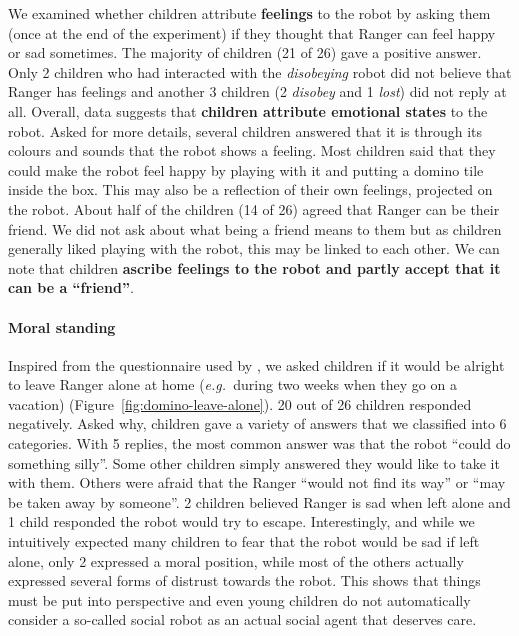 \documentclass{sig-alternate}
\newcommand{\eg}{{\textit{e.g.~}}}
\begin{document}
We examined whether children attribute \textbf{feelings} to the robot by asking
them (once at the end of the experiment) if they thought that Ranger can feel
happy or sad sometimes. The majority of
children (21 of 26) gave a positive answer. Only 2 children who had interacted
with the \textit{disobeying} robot did not believe that Ranger has feelings and
another 3 children (2 \textit{disobey} and 1 \textit{lost}) did not reply at
all. Overall, data suggests that \textbf{children attribute emotional states}
to the robot. Asked for more details, several children answered that it is
through its colours and sounds that the robot shows a feeling. Most children said
that they could make the robot feel happy by playing with it and putting a
domino tile inside the box. This may also be a reflection of their own feelings,
projected on the robot. About half of the children (14 of 26) agreed that Ranger
can be their friend. We did not ask about what being a friend means to them but
as children generally liked playing with the robot, this may be linked to each
other. We can note that children \textbf{ascribe feelings to the robot and
partly accept that it can be a ``friend''}.


\paragraph{Moral standing}

Inspired from the questionnaire used by \cite{kahn_jr._robotic_2006}, we asked
children if it would be alright to leave Ranger alone at home (\eg during two
weeks when they go on a vacation) (Figure~\ref{fig:domino-leave-alone}). 
20 out of 26 children responded negatively. Asked why, children gave a
variety of answers that we classified into 6 categories. With 5 replies, the
most common answer was that the robot ``could do something silly''. Some other
children simply answered they would like to take it with them. Others were
afraid that the Ranger ``would not find its way'' or ``may be taken away by
someone''. 2 children believed Ranger is sad when left alone and 1 child
responded the robot would try to escape. Interestingly, and while we intuitively
expected many children to fear that the robot would be sad if left alone, only 2
expressed a moral position, while most of the others actually expressed several
forms of distrust towards the robot. This shows that things must
be put into perspective and even young children do not automatically consider a
so-called social robot as an actual social agent that deserves care.
\end{document}
